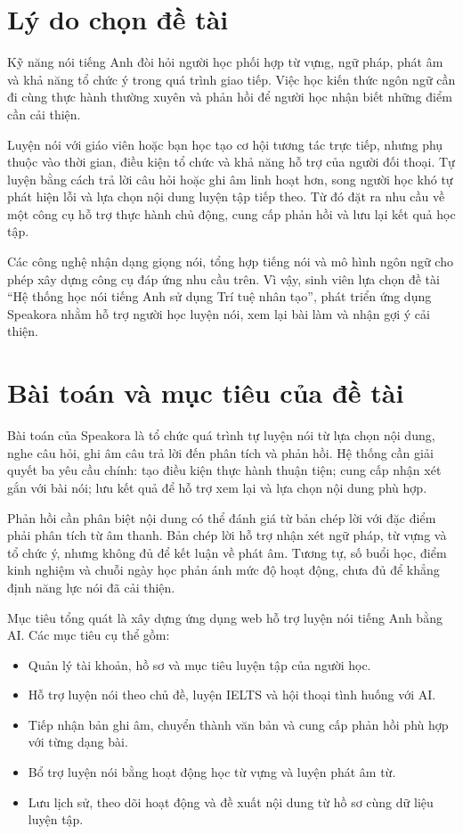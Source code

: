\documentclass[12pt,a4paper,oneside]{report}
\begin{document}
\section{Lý do chọn đề tài}

Kỹ năng nói tiếng Anh đòi hỏi người học phối hợp từ vựng, ngữ pháp, phát âm và khả năng tổ chức ý trong quá trình giao tiếp. Việc học kiến thức ngôn ngữ cần đi cùng thực hành thường xuyên và phản hồi để người học nhận biết những điểm cần cải thiện.

Luyện nói với giáo viên hoặc bạn học tạo cơ hội tương tác trực tiếp, nhưng phụ thuộc vào thời gian, điều kiện tổ chức và khả năng hỗ trợ của người đối thoại. Tự luyện bằng cách trả lời câu hỏi hoặc ghi âm linh hoạt hơn, song người học khó tự phát hiện lỗi và lựa chọn nội dung luyện tập tiếp theo. Từ đó đặt ra nhu cầu về một công cụ hỗ trợ thực hành chủ động, cung cấp phản hồi và lưu lại kết quả học tập.

Các công nghệ nhận dạng giọng nói, tổng hợp tiếng nói và mô hình ngôn ngữ cho phép xây dựng công cụ đáp ứng nhu cầu trên. Vì vậy, sinh viên lựa chọn đề tài ``Hệ thống học nói tiếng Anh sử dụng Trí tuệ nhân tạo'', phát triển ứng dụng Speakora nhằm hỗ trợ người học luyện nói, xem lại bài làm và nhận gợi ý cải thiện.

\section{Bài toán và mục tiêu của đề tài}

Bài toán của Speakora là tổ chức quá trình tự luyện nói từ lựa chọn nội dung, nghe câu hỏi, ghi âm câu trả lời đến phân tích và phản hồi. Hệ thống cần giải quyết ba yêu cầu chính: tạo điều kiện thực hành thuận tiện; cung cấp nhận xét gắn với bài nói; lưu kết quả để hỗ trợ xem lại và lựa chọn nội dung phù hợp.

Phản hồi cần phân biệt nội dung có thể đánh giá từ bản chép lời với đặc điểm phải phân tích từ âm thanh. Bản chép lời hỗ trợ nhận xét ngữ pháp, từ vựng và tổ chức ý, nhưng không đủ để kết luận về phát âm. Tương tự, số buổi học, điểm kinh nghiệm và chuỗi ngày học phản ánh mức độ hoạt động, chưa đủ để khẳng định năng lực nói đã cải thiện.

Mục tiêu tổng quát là xây dựng ứng dụng web hỗ trợ luyện nói tiếng Anh bằng AI. Các mục tiêu cụ thể gồm:
\begin{itemize}
    \item Quản lý tài khoản, hồ sơ và mục tiêu luyện tập của người học.
    \item Hỗ trợ luyện nói theo chủ đề, luyện IELTS và hội thoại tình huống với AI.
    \item Tiếp nhận bản ghi âm, chuyển thành văn bản và cung cấp phản hồi phù hợp với từng dạng bài.
    \item Bổ trợ luyện nói bằng hoạt động học từ vựng và luyện phát âm từ.
    \item Lưu lịch sử, theo dõi hoạt động và đề xuất nội dung từ hồ sơ cùng dữ liệu luyện tập.
\end{itemize}
\end{document}
